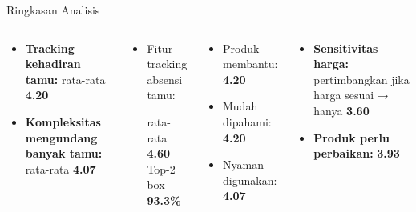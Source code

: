 \documentclass[aspectratio=169]{beamer}
\newcommand{\faExclamationTriangle}{[!]}
\newcommand{\faChartLine}{[\char126]}
\newcommand{\faCheckCircle}{[\checkmark]}
\newcommand{\faTimesCircle}{[x]}
\begin{document}
\begin{frame}{Ringkasan Analisis}
  \begin{columns}[T]
      \begin{tcolorbox}[statbox,title={\faExclamationTriangle\quad Masalah Terbesar}]
        \begin{itemize}\small
          \item \textbf{Tracking kehadiran tamu:} rata-rata \textcolor{accent}{\textbf{4.20}}
          \item \textbf{Kompleksitas mengundang banyak tamu:} rata-rata \textcolor{accent}{\textbf{4.07}}
        \end{itemize}
      \end{tcolorbox}
      \vspace{0.3cm}
      \begin{tcolorbox}[statbox,title={\faChartLine\quad Minat Solusi}]
        \begin{itemize}\small
          \item Fitur tracking absensi tamu:\par
            rata-rata \textcolor{success}{\textbf{4.60}} \quad Top-2 box \textcolor{success}{\textbf{93.3\%}}
        \end{itemize}
      \end{tcolorbox}
      \begin{tcolorbox}[insightbox,title={\faCheckCircle\quad Validasi MVP}]
        \begin{itemize}\small
          \item Produk membantu: \textbf{4.20}
          \item Mudah dipahami: \textbf{4.20}
          \item Nyaman digunakan: \textbf{4.07}
        \end{itemize}
      \end{tcolorbox}
      \vspace{0.3cm}
      \begin{tcolorbox}[implbox,title={\faTimesCircle\quad Area Perlu Perhatian}]
        \begin{itemize}\small
          \item \textbf{Sensitivitas harga:} pertimbangkan jika harga sesuai → hanya \textbf{3.60}
          \item \textbf{Produk perlu perbaikan:} \textbf{3.93}
        \end{itemize}
      \end{tcolorbox}
  \end{columns}
\end{frame}
\end{document}
